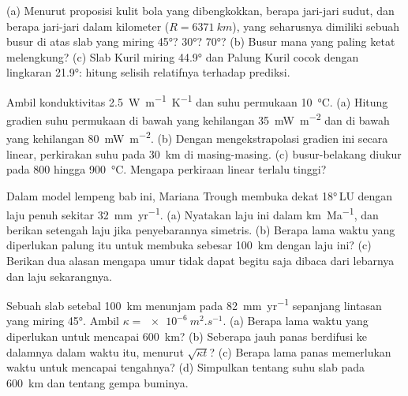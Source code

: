 \begin{exercise}[$\star\star$]\label{exo:b1:active-margins:7}
(a) Menurut proposisi kulit bola yang dibengkokkan, berapa jari-jari sudut, dan berapa jari-jari dalam kilometer ($R = \qty{6371}{km}$), yang seharusnya dimiliki sebuah busur di atas slab yang miring \ang{45}? \ang{30}? \ang{70}? (b) Busur mana yang paling ketat melengkung? (c) Slab Kuril miring \ang{44.9} dan Palung Kuril cocok dengan lingkaran \ang{21.9}: hitung selisih relatifnya terhadap prediksi.
\end{exercise}

\begin{exercise}[$\star\star$]\label{exo:b1:active-margins:8}
Ambil konduktivitas \qty{2.5}{W.m^{-1}.K^{-1}} dan suhu permukaan \qty{10}{\celsius}. (a) Hitung gradien suhu permukaan di bawah  yang kehilangan \qty{35}{mW.m^{-2}} dan di bawah  yang kehilangan \qty{80}{mW.m^{-2}}. (b) Dengan mengekstrapolasi gradien ini secara linear, perkirakan suhu pada \qty{30}{km} di masing-masing. (c)  busur-belakang diukur pada 800 hingga \qty{900}{\celsius}. Mengapa perkiraan linear terlalu tinggi?
\end{exercise}

\begin{exercise}[$\star\star$]\label{exo:b1:active-margins:9}
Dalam model lempeng bab ini, Mariana Trough membuka dekat \ang{18}\,LU dengan laju penuh sekitar \qty{32}{mm.yr^{-1}}. (a) Nyatakan laju ini dalam \unit{km.Ma^{-1}}, dan berikan setengah laju jika penyebarannya simetris. (b) Berapa lama waktu yang diperlukan palung itu untuk membuka sebesar \qty{100}{km} dengan laju ini? (c) Berikan dua alasan mengapa umur  tidak dapat begitu saja dibaca dari lebarnya dan laju sekarangnya.
\end{exercise}

\begin{exercise}[$\star\star\star$]\label{exo:b1:active-margins:10}
Sebuah slab setebal \qty{100}{km} menunjam pada \qty{82}{mm.yr^{-1}} sepanjang lintasan yang miring \ang{45}. Ambil $\kappa = \qty{e-6}{m^2.s^{-1}}$. (a) Berapa lama waktu yang diperlukan untuk mencapai \qty{600}{km}? (b) Seberapa jauh panas berdifusi ke dalamnya dalam waktu itu, menurut $\sqrt{\kappa t}$? (c) Berapa lama panas memerlukan waktu untuk mencapai tengahnya? (d) Simpulkan tentang suhu slab pada \qty{600}{km} dan tentang gempa buminya.
\end{exercise}

